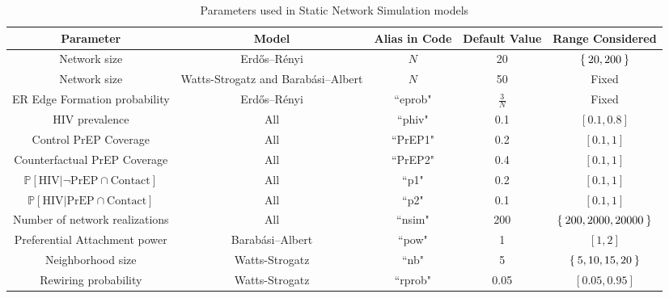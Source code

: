 \documentclass{article}
\theoremstyle{definition}
\begin{document}
\newpage
\begin{landscape}
\begin{table}[H]
    \centering
    \begin{tabular}{|c|c|c|c|c|}
    \hline
    \bf Parameter & \bf Model & \bf Alias in Code & \bf Default Value & \bf Range Considered  \\
    \hline
    Network size & Erdős–Rényi& $N$& 20 & $\Set{20,200}$\\
    \hline
    Network size & Watts-Strogatz and Barabási–Albert & $N$& 50 & Fixed \\
    \hline
    ER Edge Formation probability & Erdős–Rényi & ``eprob" & $\frac{3}{N}$ & Fixed \\
    \hline
    HIV prevalence & All & ``phiv" & 0.1 & $[0.1,0.8]$\\
    \hline
    Control PrEP Coverage & All & ``PrEP1" & 0.2 & $[0.1,1]$\\
    \hline
    Counterfactual PrEP Coverage & All & ``PrEP2" & 0.4 & $[0.1,1]$\\
    \hline
    $\mathbb{P}\left[\text{HIV} \vert \neg \text{PrEP} \cap \text{Contact}\right]$ & All & ``p1" & 0.2 & $[0.1,1]$\\
    \hline
    $\mathbb{P}\left[\text{HIV} \vert \text{PrEP} \cap \text{Contact}\right]$ & All & ``p2"  & 0.1 & $[0.1,1]$\\
    \hline
    Number of network realizations & All & ``nsim" & 200 & $\Set{200,2000,20000}$\\
    \hline
    Preferential Attachment power & Barabási–Albert& ``pow" & 1 & $\left[1,2 \right]$ \\
    \hline
    Neighborhood size & Watts-Strogatz & ``nb" & 5 & $\Set{5,10,15,20}$ \\
    \hline
    Rewiring probability & Watts-Strogatz &  ``rprob" & 0.05 &$\left[0.05, 0.95 \right]$ \\
    \hline
    \end{tabular}
    \caption{Parameters used in Static Network Simulation models}
    \label{tab:table1}
\end{table}
\end{landscape}
\newpage
         
\end{document}
